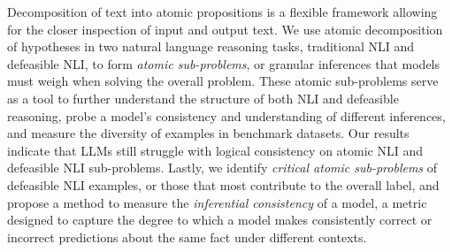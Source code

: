Decomposition of text into atomic propositions is a flexible framework allowing for the closer inspection of input and output text.
%
We use atomic decomposition of hypotheses in two natural language reasoning tasks, traditional NLI and defeasible NLI, to form \textit{atomic sub-problems}, or granular inferences that models must weigh when solving the overall problem.
%
These atomic sub-problems serve as a tool to further understand the structure of both NLI and defeasible reasoning, probe a model's consistency and understanding of different inferences, and measure the diversity of examples in benchmark datasets. 
%
Our results indicate that LLMs still struggle with logical consistency on atomic NLI and defeasible NLI sub-problems.
%
Lastly, we identify \textit{critical atomic sub-problems} of defeasible NLI examples, or those that most contribute to the overall label, and propose a method to measure the \textit{inferential consistency} of a model, a metric designed to capture the degree to which a model makes consistently correct or incorrect predictions about the same fact under different contexts.